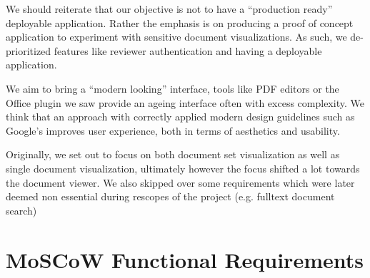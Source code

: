 \documentclass[\version]{l4proj}
\begin{document}
We should reiterate that our objective is not to have a ``production ready'' deployable application.
Rather the emphasis is on producing a proof of concept application to experiment with sensitive document visualizations.
As such, we de-prioritized features like reviewer authentication and having a deployable application.

We aim to bring a ``modern looking'' interface, tools like PDF editors or the Office plugin we saw provide an ageing interface often with excess complexity.
We think that an approach with correctly applied modern design guidelines such as Google's \textcite{MaterialDesign} improves user experience, both in terms of aesthetics and usability.

Originally, we set out to focus on both document set visualization as well as single document visualization, ultimately however the focus shifted a lot towards the document viewer.
We also skipped over some requirements which were later deemed non essential during rescopes of the project (e.g. fulltext document search)

\section{MoSCoW Functional Requirements}
\end{document}
